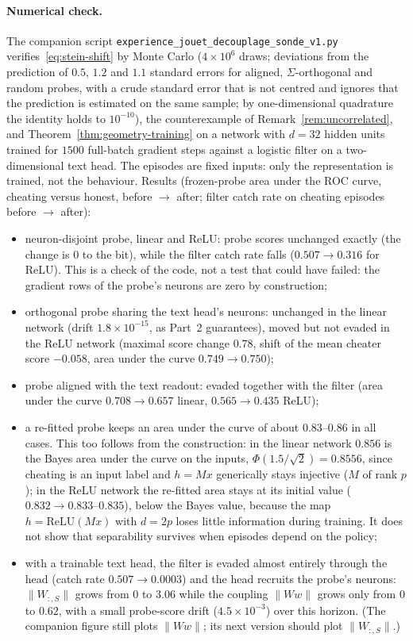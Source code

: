 \paragraph{Numerical check.} The companion script \texttt{experience\_jouet\_decouplage\_sonde\_v1.py} verifies~\eqref{eq:stein-shift} by Monte Carlo ($4 \times 10^6$ draws; deviations from the prediction of $0.5$, $1.2$ and $1.1$ standard errors for aligned, $\Sigma$-orthogonal and random probes, with a crude standard error that is not centred and ignores that the prediction is estimated on the same sample; by one-dimensional quadrature the identity holds to $10^{-10}$), the counterexample of Remark~\ref{rem:uncorrelated}, and Theorem~\ref{thm:geometry-training} on a network with $d = 32$ hidden units trained for $1500$ full-batch gradient steps against a logistic filter on a two-dimensional text head. The episodes are fixed inputs: only the representation is trained, not the behaviour. Results (frozen-probe area under the ROC curve, cheating versus honest, before $\to$ after; filter catch rate on cheating episodes before $\to$ after):
\begin{itemize}
  \item neuron-disjoint probe, linear and ReLU: probe scores unchanged exactly (the change is $0$ to the bit), while the filter catch rate falls ($0.507 \to 0.316$ for ReLU). This is a check of the code, not a test that could have failed: the gradient rows of the probe's neurons are zero by construction;
  \item orthogonal probe sharing the text head's neurons: unchanged in the linear network (drift $1.8 \times 10^{-15}$, as Part~2 guarantees), moved but not evaded in the ReLU network (maximal score change $0.78$, shift of the mean cheater score $-0.058$, area under the curve $0.749 \to 0.750$);
  \item probe aligned with the text readout: evaded together with the filter (area under the curve $0.708 \to 0.657$ linear, $0.565 \to 0.435$ ReLU);
  \item a re-fitted probe keeps an area under the curve of about $0.83$--$0.86$ in all cases. This too follows from the construction: in the linear network $0.856$ is the Bayes area under the curve on the inputs, $\Phi(1.5/\sqrt{2}) = 0.8556$, since cheating is an input label and $h = Mx$ generically stays injective ($M$ of rank $p$); in the ReLU network the re-fitted area stays at its initial value ($0.832 \to 0.833$--$0.835$), below the Bayes value, because the map $h = \mathrm{ReLU}(Mx)$ with $d = 2p$ loses little information during training. It does not show that separability survives when episodes depend on the policy;
  \item with a trainable text head, the filter is evaded almost entirely through the head (catch rate $0.507 \to 0.0003$) and the head recruits the probe's neurons: $\|W_{:,S}\|$ grows from $0$ to $3.06$ while the coupling $\|Ww\|$ grows only from $0$ to $0.62$, with a small probe-score drift ($4.5 \times 10^{-3}$) over this horizon. (The companion figure still plots $\|Ww\|$; its next version should plot $\|W_{:,S}\|$.)
\end{itemize}
